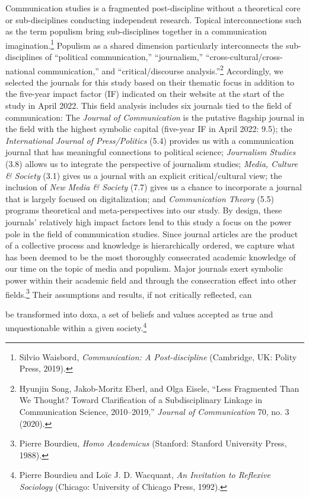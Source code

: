 \documentclass{tufte-handout}
\begin{document}
Communication studies is a fragmented post-discipline without a
theoretical core or sub-disciplines conducting independent research.
Topical interconnections such as the term populism bring sub-disciplines
together in a communication imagination.\footnote{Silvio Waisbord,
  \emph{Communication: A Post-discipline} (Cambridge, UK: Polity Press,
  2019).} Populism as a shared dimension particularly interconnects the
sub-disciplines of ``political communication,'' ``journalism,''
``cross-cultural/cross-national communication,'' and
``critical/discourse analysis.''\footnote{Hyunjin Song, Jakob-Moritz
  Eberl, and Olga Eisele, ``Less Fragmented Than We Thought? Toward
  Clarification of a Subdisciplinary Linkage in Communication Science,
  2010--2019,'' \emph{Journal of Communication} 70, no. 3 (2020).}
Accordingly, we selected the journals for this study based on their
thematic focus in addition to the five-year impact factor (IF) indicated
on their website at the start of the study in April 2022. This field
analysis includes six journals tied to the field of communication: The
\emph{Journal of Communication} is the putative flagship journal in the
field with the highest symbolic capital (five-year IF in April 2022:
9.5); the \emph{International Journal of Press/Politics} (5.4) provides
us with a communication journal that has meaningful connections to
political science; \emph{Journalism Studies} (3.8) allows us to
integrate the perspective of journalism studies; \emph{Media, Culture \&
Society} (3.1) gives us a journal with an explicit critical/cultural
view; the inclusion of \emph{New Media \& Society} (7.7) gives us a
chance to incorporate a journal that is largely focused on
digitalization; and \emph{Communication Theory} (5.5) programs
theoretical and meta-perspectives into our study. By design, these
journals' relatively high impact factors lend to this study a focus on
the power pole in the field of communication studies. Since journal
articles are the product of a collective process and knowledge is
hierarchically ordered, we capture what has been deemed to be the most
thoroughly consecrated academic knowledge of our time on the topic of
media and populism. Major journals exert symbolic power within their
academic field and through the consecration effect into other
fields.\footnote{Pierre Bourdieu, \emph{Homo Academicus} (Stanford:
  Stanford University Press, 1988).} Their assumptions and results, if
not critically reflected, can\pagebreak

\noindent be transformed into doxa, a set of beliefs
and values accepted as true and unquestionable within a given
society.\footnote{Pierre Bourdieu and Loïc J. D. Wacquant, \emph{An
  Invitation to Reflexive Sociology} (Chicago: University of Chicago
  Press, 1992).}
\end{document}
